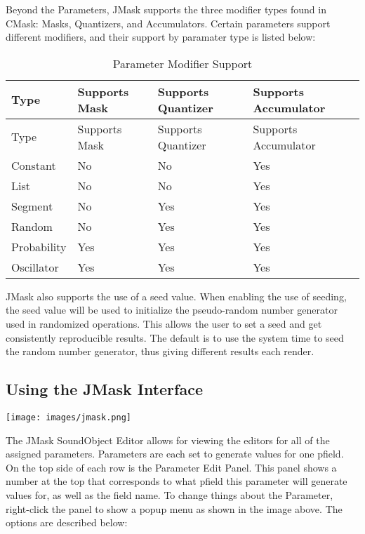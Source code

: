 Beyond the Parameters, JMask supports the three modifier types found in
CMask: Masks, Quantizers, and Accumulators. Certain parameters support
different modifiers, and their support by paramater type is listed
below:

\begin{longtable}[]{@{}llll@{}}
\caption{Parameter Modifier Support}\tabularnewline
\toprule
Type & Supports Mask & Supports Quantizer & Supports
Accumulator\tabularnewline
\midrule
\endfirsthead
\toprule
Type & Supports Mask & Supports Quantizer & Supports
Accumulator\tabularnewline
\midrule
\endhead
Constant & No & No & Yes\tabularnewline
List & No & No & Yes\tabularnewline
Segment & No & Yes & Yes\tabularnewline
Random & No & Yes & Yes\tabularnewline
Probability & Yes & Yes & Yes\tabularnewline
Oscillator & Yes & Yes & Yes\tabularnewline
\bottomrule
\end{longtable}

JMask also supports the use of a seed value. When enabling the use of
seeding, the seed value will be used to initialize the pseudo-random
number generator used in randomized operations. This allows the user to
set a seed and get consistently reproducible results. The default is to
use the system time to seed the random number generator, thus giving
different results each render.

\subsection{Using the JMask Interface}\label{jmaskInterface}

\texttt{[image: images/jmask.png]}

The JMask SoundObject Editor allows for viewing the editors for all of
the assigned parameters. Parameters are each set to generate values for
one pfield. On the top side of each row is the Parameter Edit Panel.
This panel shows a number at the top that corresponds to what pfield
this parameter will generate values for, as well as the field name. To
change things about the Parameter, right-click the panel to show a popup
menu as shown in the image above. The options are described below:


